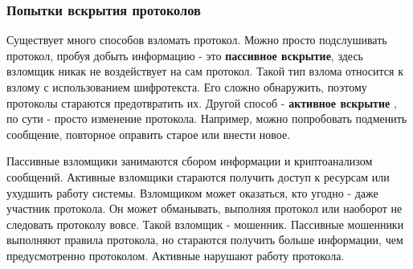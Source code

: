 \documentclass[a4paper]{article}
\begin{document}
\subsubsection{Попытки вскрытия протоколов}
Существует много способов взломать протокол. Можно просто подслушивать протокол, пробуя добыть информацию - это \textbf{пассивное вскрытие}, здесь взломщик никак не воздействует на сам протокол.
Такой тип взлома относится к взлому с использованием шифротекста. Его сложно обнаружить, поэтому протоколы стараются предотвратить их.
Другой способ - \textbf{активное вскрытие }, по сути - просто изменение протокола. Например, можно попробовать подменить сообщение, повторное оправить старое или внести новое.
\par
Пассивные взломщики занимаются сбором информации и криптоанализом сообщений. Активные взломщики стараются получить доступ к ресурсам или ухудшить работу системы.
Взломщиком может оказаться, кто угодно - даже участник протокола. Он может обманывать, выполняя протокол или наоборот не следовать протоколу вовсе. Такой взломщик - мошенник. Пассивные мошенники выполняют правила протокола, но стараются получить больше информации, чем предусмотренно протоколом.
Активные нарушают работу протокола.
\end{document}
